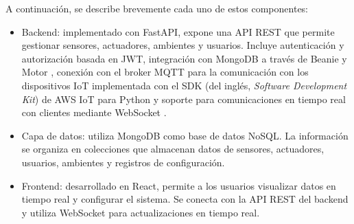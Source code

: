 A continuación, se describe brevemente cada uno de estos componentes:

\begin{itemize}
    \item Backend: implementado con FastAPI, expone una API REST que permite gestionar
          sensores, actuadores, ambientes y usuarios. Incluye autenticación y
          autorización basada en JWT, integración con MongoDB a través de Beanie
          \cite{BeaniODM} y Motor \cite{MotorMongoDB}, conexión con el broker MQTT para
          la comunicación con los dispositivos IoT implementada con el SDK (del inglés,
          \textit{Software Development Kit}) de AWS IoT para Python \cite{AWSIoTSDK} y
          soporte para comunicaciones en tiempo real con clientes mediante WebSocket
          \cite{FastAPIWebSockets}.

    \item Capa de datos: utiliza MongoDB como base de datos NoSQL. La información se
          organiza en colecciones que almacenan datos de sensores, actuadores, usuarios,
          ambientes y registros de configuración.

    \item Frontend: desarrollado en React, permite a los usuarios visualizar datos en
          tiempo real y configurar el sistema. Se conecta con la API REST del backend y
          utiliza WebSocket \cite{SocketIO} para actualizaciones en tiempo real.
\end{itemize}



